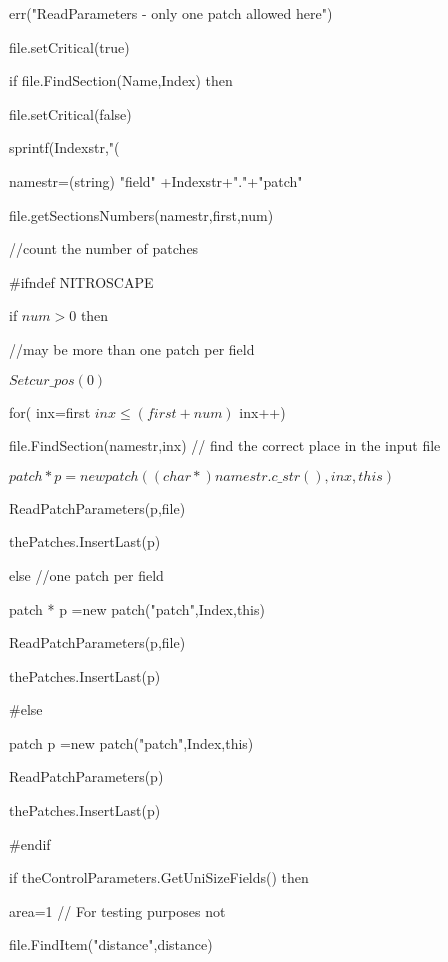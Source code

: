 \documentclass[%
]{scrartcl}
\begin{document}
   \quad     err("ReadParameters - only one patch allowed here")

   file.setCritical(true)
   
   if file.FindSection(Name,Index) then
   
	 \quad	  file.setCritical(false)

     \quad	  sprintf(Indexstr,"(%
      
     \quad	  namestr=(string) "field" +Indexstr+"."+"patch"
      
    \quad	   file.getSectionsNumbers(namestr,first,num)  
      
    \quad	    //count the number of patches
       
\#ifndef NITROSCAPE

      if $num>0$ then 
      
      \quad //may be more than one patch per field
      
	   \quad	    $Setcur\_pos(0)$
     
       \quad	   for( inx=first $inx\le (first+num)$ inx++)
         
      \quad	  \quad	    file.FindSection(namestr,inx)   // find the correct place in the input file
      
       \quad	  \quad	  
$ patch * p =new patch((char *)namestr.c\_str(),inx,this)$
      
       \quad	 \quad	    ReadPatchParameters(p,file)
     
      \quad	 \quad	     thePatches.InsertLast(p)
      
     
      else   //one patch per field
    
     \quad	    patch * p =new patch("patch",Index,this)
     
     \quad	    ReadPatchParameters(p,file)
   	
   	  \quad	   thePatches.InsertLast(p)
	

\#else


		patch p =new patch("patch",Index,this)
		
		ReadPatchParameters(p)
		
		thePatches.InsertLast(p)
	

\#endif

   	
      
      if theControlParameters.GetUniSizeFields() then
       
         \quad  area=1  // For testing purposes not 
      
       \quad file.FindItem("distance",distance)
\end{document}
